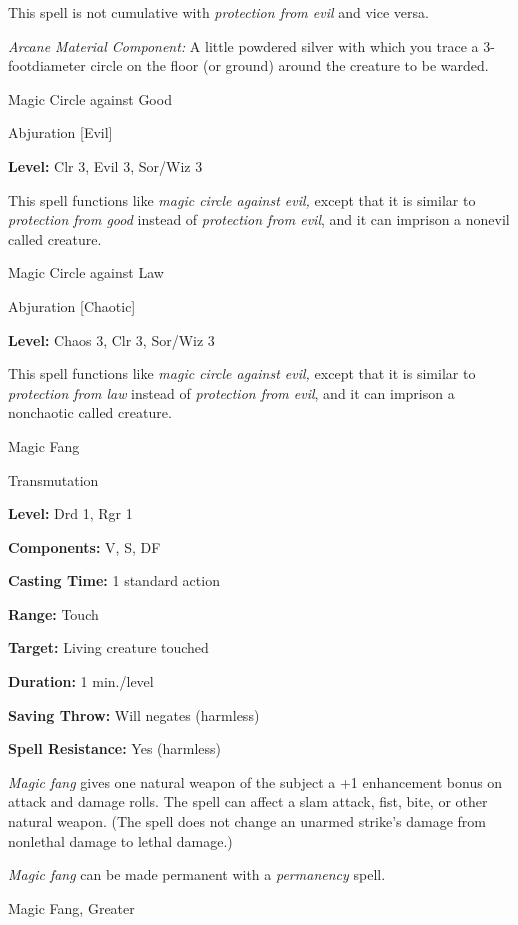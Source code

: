 \documentclass{article}
\begin{document}
This spell is not cumulative with \textit{protection from evil }and vice versa.

\textit{Arcane Material Component: }A little powdered silver with which you trace 
a 3-footdiameter circle on the floor (or ground) around the creature to be warded.

\vspace{12pt}
Magic Circle against Good

Abjuration [Evil]

\textbf{Level:} Clr 3, Evil 3, Sor/Wiz 3

This spell functions like \textit{magic circle against evil, }except that it is 
similar to \textit{protection from good }instead of \textit{protection from evil}, 
and it can imprison a nonevil called creature.

\vspace{12pt}
Magic Circle against Law

Abjuration [Chaotic]

\textbf{Level:} Chaos 3, Clr 3, Sor/Wiz 3

This spell functions like \textit{magic circle against evil, }except that it is 
similar to \textit{protection from law }instead of \textit{protection from evil}, 
and it can imprison a nonchaotic called creature.

\vspace{12pt}
Magic Fang

Transmutation

\textbf{Level:} Drd 1, Rgr 1

\textbf{Components:} V, S, DF

\textbf{Casting Time:} 1 standard action

\textbf{Range:} Touch

\textbf{Target:} Living creature touched

\textbf{Duration:} 1 min./level

\textbf{Saving Throw: }Will negates (harmless)

\textbf{Spell Resistance:} Yes (harmless)

\textit{Magic fang }gives one natural weapon of the subject a +1 enhancement bonus 
on attack and damage rolls. The spell can affect a slam attack, fist, bite, or 
other natural weapon. (The spell does not change an unarmed strike's damage from 
nonlethal damage to lethal damage.)

\textit{Magic fang }can be made permanent with a \textit{permanency }spell.

\vspace{12pt}
Magic Fang, Greater
\end{document}
